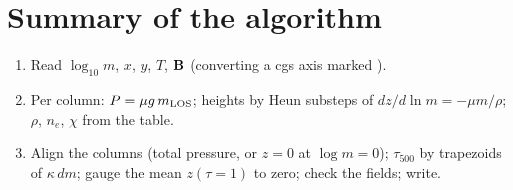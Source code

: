 \adjointcolumntrue


\section{Summary of the algorithm}
\begin{enumerate}
\item Read $\log_{10}m$, $x$, $y$, $T$, $\mathbf B$ (converting a cgs axis marked ).
\item Per column: $P=\mu g\,m_{\rm LOS}$; heights by Heun substeps of $dz/d\ln m=-\mu m/\rho$; $\rho$, $n_e$, $\chi$ from the table.
\item Align the columns (total pressure, or $z=0$ at $\log m=0$); $\tau_{500}$ by trapezoids of $\kappa\,dm$; gauge the mean
$z(\tau{=}1)$ to zero; check the fields; write.
\end{enumerate}

